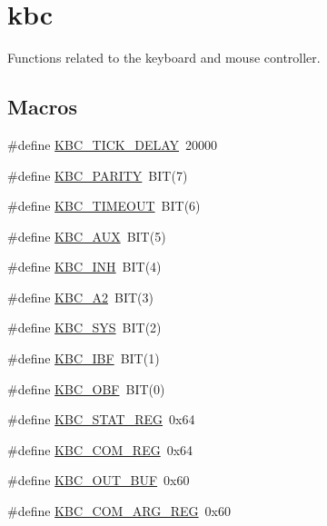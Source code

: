 \hypertarget{group__kbc}{}\section{kbc}
\label{group__kbc}


Functions related to the keyboard and mouse controller.  


\subsection*{Macros}
\begin{DoxyCompactItemize}
\item 
\#define \hyperlink{group__kbc_gab414f096b1781939124cd2ff672edb59}{K\+B\+C\+\_\+\+T\+I\+C\+K\+\_\+\+D\+E\+L\+AY}~20000
\item 
\#define \hyperlink{group__kbc_ga82a39176e42fe8f48025521b9674cdc6}{K\+B\+C\+\_\+\+P\+A\+R\+I\+TY}~B\+IT(7)
\item 
\#define \hyperlink{group__kbc_ga34599ca5c55cb9be3b235d7422aff45c}{K\+B\+C\+\_\+\+T\+I\+M\+E\+O\+UT}~B\+IT(6)
\item 
\#define \hyperlink{group__kbc_gaaa796d09d1e94025da456738295342f2}{K\+B\+C\+\_\+\+A\+UX}~B\+IT(5)
\item 
\#define \hyperlink{group__kbc_ga869c99dd1e3e026e766b3a1c75729df1}{K\+B\+C\+\_\+\+I\+NH}~B\+IT(4)
\item 
\#define \hyperlink{group__kbc_ga933a8846def486d800a725dc3959a74b}{K\+B\+C\+\_\+\+A2}~B\+IT(3)
\item 
\#define \hyperlink{group__kbc_ga9e3fddced5da8ee918cc20e74ff124d8}{K\+B\+C\+\_\+\+S\+YS}~B\+IT(2)
\item 
\#define \hyperlink{group__kbc_gac1649d41f8ba9a02fa70ec4e600d5e4a}{K\+B\+C\+\_\+\+I\+BF}~B\+IT(1)
\item 
\#define \hyperlink{group__kbc_ga36930de8a703505c95fe133095dcfe06}{K\+B\+C\+\_\+\+O\+BF}~B\+IT(0)
\item 
\#define \hyperlink{group__kbc_ga34b14687d83496940a236351fbbb1aea}{K\+B\+C\+\_\+\+S\+T\+A\+T\+\_\+\+R\+EG}~0x64
\item 
\#define \hyperlink{group__kbc_ga693314276867029f4c094442a261159f}{K\+B\+C\+\_\+\+C\+O\+M\+\_\+\+R\+EG}~0x64
\item 
\#define \hyperlink{group__kbc_ga1ccde68b2b6d4e45b50eef1403e10bb7}{K\+B\+C\+\_\+\+O\+U\+T\+\_\+\+B\+UF}~0x60
\item 
\#define \hyperlink{group__kbc_ga44b2468c0ea248ca480a8863b3f78c34}{K\+B\+C\+\_\+\+C\+O\+M\+\_\+\+A\+R\+G\+\_\+\+R\+EG}~0x60

\end{DoxyCompactItemize}
